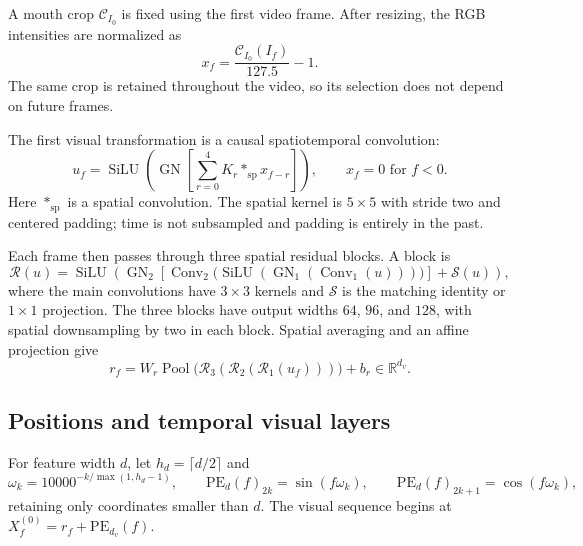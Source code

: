 \documentclass[11pt,a4paper]{article}
\newcommand{\R}{\mathbb{R}}
\newcommand{\GN}{\operatorname{GN}}
\newcommand{\silu}{\operatorname{SiLU}}
\DeclareMathOperator{\Pool}{Pool}
\DeclareMathOperator{\Conv}{Conv}
\numberwithin{equation}{section}
\begin{document}
A mouth crop $\mathcal C_{I_0}$ is fixed using the first video frame.
After resizing, the RGB intensities are normalized as
\begin{equation}
x_f=\frac{\mathcal C_{I_0}(I_f)}{127.5}-1.
\end{equation}
The same crop is retained throughout the video, so its selection does
not depend on future frames.

The first visual transformation is a causal spatiotemporal convolution:
\begin{equation}
u_f=\silu\!\left(\GN\!\left[
   \sum_{r=0}^{4}K_r*_{\mathrm{sp}}x_{f-r}
\right]\right),\qquad x_f=0\text{ for }f<0.
\end{equation}
Here $*_{\mathrm{sp}}$ is a spatial convolution. The spatial kernel is
$5\times5$ with stride two and centered padding; time is not
subsampled and padding is entirely in the past.

Each frame then passes through three spatial residual blocks. A block is
\begin{equation}
\mathcal R(u)=\silu\!\left(
 \GN_2\!\left[\Conv_2\bigl(\silu(\GN_1(\Conv_1(u)))\bigr)\right]
 +\mathcal S(u)\right),
\end{equation}
where the main convolutions have $3\times3$ kernels and $\mathcal S$
is the matching identity or $1\times1$ projection. The three blocks
have output widths $64$, $96$, and $128$, with spatial downsampling by
two in each block. Spatial averaging and an affine projection give
\begin{equation}
r_f=W_r\Pool\bigl(\mathcal R_3(\mathcal R_2(\mathcal R_1(u_f)))\bigr)+b_r
\in\R^{d_v}.
\end{equation}

\subsection{Positions and temporal visual layers}

For feature width $d$, let $h_d=\lceil d/2\rceil$ and
\begin{equation}
\omega_k=10000^{-k/\max(1,h_d-1)},\qquad
\mathrm{PE}_d(f)_{2k}=\sin(f\omega_k),\qquad
\mathrm{PE}_d(f)_{2k+1}=\cos(f\omega_k),
\label{eq:positions}
\end{equation}
retaining only coordinates smaller than $d$. The visual sequence begins
at $X^{(0)}_f=r_f+\mathrm{PE}_{d_v}(f)$.
\end{document}
